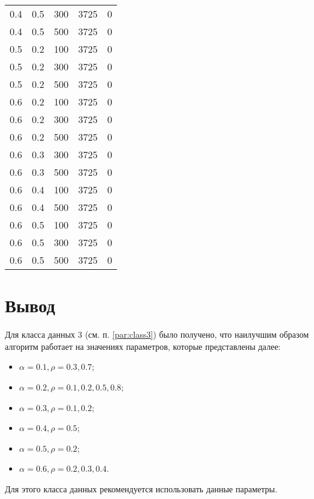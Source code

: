 \begin{center}
\begin{longtable}[c]{|r|r|r|r|r|}
		0.4 &  0.5 &  300 & 3725 &     0 \\
		0.4 &  0.5 &  500 & 3725 &     0 \\ \hline
		0.5 &  0.2 &  100 & 3725 &     0 \\
		0.5 &  0.2 &  300 & 3725 &     0 \\
		0.5 &  0.2 &  500 & 3725 &     0 \\ \hline
		0.6 &  0.2 &  100 & 3725 &     0 \\
		0.6 &  0.2 &  300 & 3725 &     0 \\
		0.6 &  0.2 &  500 & 3725 &     0 \\ \hline
		0.6 &  0.3 &  300 & 3725 &     0 \\
		0.6 &  0.3 &  500 & 3725 &     0 \\ \hline
		0.6 &  0.4 &  100 & 3725 &     0 \\
		0.6 &  0.4 &  500 & 3725 &     0 \\ \hline
		0.6 &  0.5 &  100 & 3725 &     0 \\
		0.6 &  0.5 &  300 & 3725 &     0 \\
		0.6 &  0.5 &  500 & 3725 &     0 \\ \hline
	\end{longtable}
\end{center}

\section{Вывод}



Для класса данных 3 (см. п. \ref{par:class3}) было получено, что наилучшим образом алгоритм работает на значениях параметров, которые представлены далее:
\begin{itemize}[label=---]
	\item $\alpha = 0.1, \rho = 0.3, 0.7$;
	\item $\alpha = 0.2, \rho = 0.1, 0.2, 0.5, 0.8$;
	\item $\alpha = 0.3, \rho = 0.1, 0.2$;
	\item $\alpha = 0.4, \rho = 0.5$;
	\item $\alpha = 0.5, \rho = 0.2$;
	\item $\alpha = 0.6, \rho = 0.2, 0.3, 0.4$.
\end{itemize} 
Для этого класса данных рекомендуется использовать данные параметры.